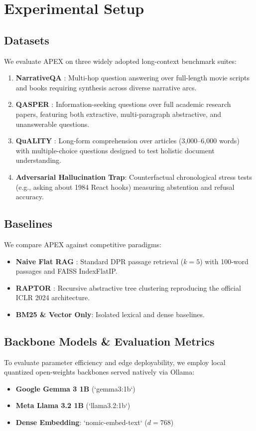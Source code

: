 \documentclass[11pt,a4paper]{article}
\begin{document}
\section{Experimental Setup}
\label{sec:experiments}

\subsection{Datasets}
We evaluate APEX on three widely adopted long-context benchmark suites:
\begin{enumerate}
    \item \textbf{NarrativeQA} \cite{kocisky2018narrativeqa}: Multi-hop question answering over full-length movie scripts and books requiring synthesis across diverse narrative arcs.
    \item \textbf{QASPER} \cite{dasigi2021qasper}: Information-seeking questions over full academic research papers, featuring both extractive, multi-paragraph abstractive, and unanswerable questions.
    \item \textbf{QuALITY} \cite{pang2022quality}: Long-form comprehension over articles (3,000--6,000 words) with multiple-choice questions designed to test holistic document understanding.
    \item \textbf{Adversarial Hallucination Trap}: Counterfactual chronological stress tests (e.g., asking about 1984 React hooks) measuring abstention and refusal accuracy.
\end{enumerate}

\subsection{Baselines}
We compare APEX against competitive paradigms:
\begin{itemize}
    \item \textbf{Naive Flat RAG} \cite{lewis2020retrieval}: Standard DPR passage retrieval ($k=5$) with 100-word passages and FAISS IndexFlatIP.
    \item \textbf{RAPTOR} \cite{sarthi2024raptor}: Recursive abstractive tree clustering reproducing the official ICLR 2024 architecture.
    \item \textbf{BM25 & Vector Only}: Isolated lexical and dense baselines.
\end{itemize}

\subsection{Backbone Models & Evaluation Metrics}
To evaluate parameter efficiency and edge deployability, we employ local quantized open-weights backbones served natively via Ollama:
\begin{itemize}
    \item \textbf{Google Gemma 3 1B} (`gemma3:1b`)
    \item \textbf{Meta Llama 3.2 1B} (`llama3.2:1b`)
    \item \textbf{Dense Embedding}: `nomic-embed-text` ($d=768$)
\end{itemize}
\end{document}
